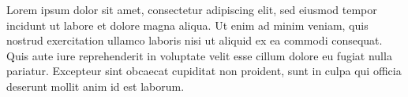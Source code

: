 Lorem ipsum dolor sit amet, consectetur adipiscing elit, sed eiusmod tempor incidunt ut labore et dolore magna aliqua.
Ut enim ad minim veniam, quis nostrud exercitation ullamco laboris nisi ut aliquid ex ea commodi consequat.
Quis aute iure reprehenderit in voluptate velit esse cillum dolore eu fugiat nulla pariatur.
Excepteur sint obcaecat cupiditat non proident, sunt in culpa qui officia deserunt mollit anim id est laborum.
